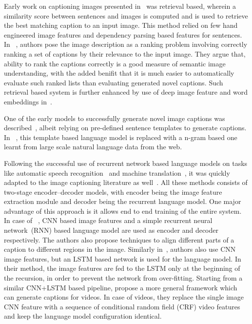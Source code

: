Early work on captioning images presented in~\cite{Farhadi2010} was retrieval
based, wherein a similarity score between sentences and images is computed and
is used to retrieve the best matching caption to an input image. 
This method relied on few hand engineered image features and dependency parsing
based features for sentences.
In ~\cite{Hodosh2013}, authors pose the image description as a ranking problem
involving correctly ranking a set of captions by their relevance to the input
image.
They argue that, ability to rank the captions correctly is a good measure of
semantic image understanding, with the added benifit that it is much easier to
automatically evaluate such ranked lists than evaluating generated novel
captions.
Such retrieval based system is further enhanced by use of deep image feature and
word embeddings in~\cite{Karpathy2014}.

One of the early models to successfully generate novel image captions was
described~\cite{kulkarni2013babytalk}, albeit relying on pre-defined sentence
templates to generate captions.
In ~\cite{Li2011}, this template based language model is replaced with a n-gram
based one learnt from large scale natural language data from the web.

Following the successful use of recurrent network based language models on
tasks like automatic speech recognition~\cite{mikolov2010recurrent} and machine
translation~\cite{bahdanau2014neural}, it was quickly adapted to the image
captioning literature as well~\cite{Karpathy_2015_CVPR, Vinyals_2015_CVPR,
donahue2015long}.
All these methods consists of two-stage encoder--decoder models, with 
encoder being the image feature extraction module and decoder being the
recurrent language model.
One major advantage of this approach is it allows end to end training of the
entire system.
In case of ~\cite{Karpathy_2015_CVPR}, CNN based image features and a simple
recurrent neural network~(RNN) based language model are used as encoder and
decoder respectively.
The authors also propose techniques to align different parts of a caption to
different regions in the image. 
Similarly in~\cite{Vinyals_2015_CVPR}, authors also use CNN image features, but
an LSTM based network is used for the language model.
In their method, the image features are fed to the LSTM only at the beginning of
the recursion, in order to prevent the network from over-fitting.
Starting from a similar CNN+LSTM based pipeline,\cite{donahue2015long} propose a
more general framework which can generate captions for videos.
In case of videos, they replace the single image CNN feature with a sequence of
conditional random field (CRF) video features and keep the language model
configuration identical.

